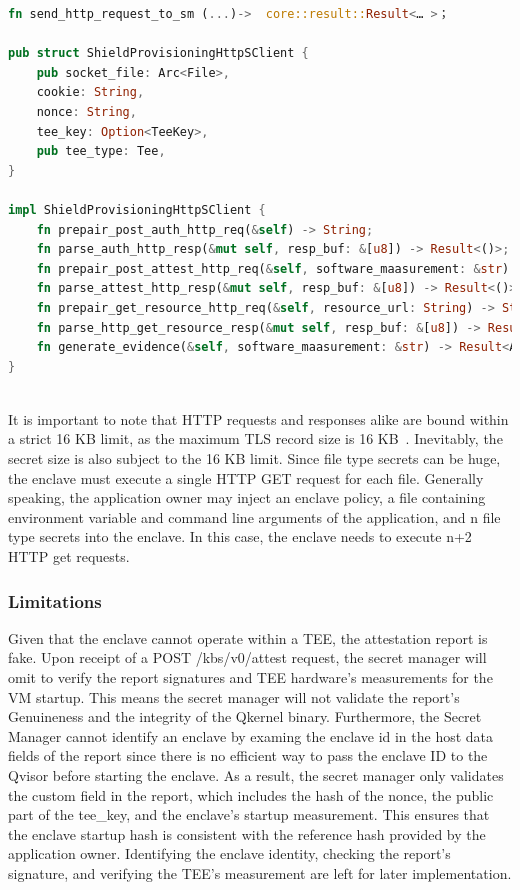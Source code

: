 \begin{lstlisting}[language=rust, caption= Functions for building the HTTP requests defined in the KBS attestation protocol, label={lst:http_connection}]
fn send_http_request_to_sm (...)->  core::result::Result<… >；

pub struct ShieldProvisioningHttpSClient {
    pub socket_file: Arc<File>,
    cookie: String,
    nonce: String,
    tee_key: Option<TeeKey>,
    pub tee_type: Tee,
}

impl ShieldProvisioningHttpSClient {
    fn prepair_post_auth_http_req(&self) -> String;
    fn parse_auth_http_resp(&mut self, resp_buf: &[u8]) -> Result<()>;
    fn prepair_post_attest_http_req(&self, software_maasurement: &str) -> Result<String>;
    fn parse_attest_http_resp(&mut self, resp_buf: &[u8]) -> Result<()>;
    fn prepair_get_resource_http_req(&self, resource_url: String) -> String;
    fn parse_http_get_resource_resp(&mut self, resp_buf: &[u8]) -> Result<Vec<u8>>;
    fn generate_evidence(&self, software_maasurement: &str) -> Result<Attestation>;
}
    
\end{lstlisting}

It is important to note that HTTP requests and responses alike are bound within a strict 16 KB limit, as the maximum TLS record size is 16 KB~\cite*{tls_record_size}. Inevitably, the secret size is also subject to the 16 KB limit. Since file type secrets can be huge, the 
enclave must execute a single HTTP GET request for each file. Generally speaking, the application owner may inject an enclave policy, a file containing environment variable and command line arguments of the application, and n file type secrets into the enclave. 
In this case, the enclave needs to execute n+2 HTTP get requests.

\subsubsection{Limitations}
\label{subsec:Limitations}

Given that the enclave cannot operate within a TEE, the attestation report is fake. Upon receipt of a POST /kbs/v0/attest request, the secret manager will omit to verify the report signatures and TEE hardware's measurements for the VM startup. This means the secret manager will not validate the report's 
Genuineness and the integrity of the Qkernel binary. Furthermore, the Secret Manager cannot identify an enclave by examing the enclave id in the host data fields of the report since there is no efficient way to pass the enclave ID to the Qvisor before starting the enclave. As a result, the secret 
manager only validates the custom field in the report, which includes the hash of the nonce, the public part of the tee\_key, and the enclave's startup measurement. This ensures that the enclave startup hash is consistent with the reference hash provided by the application owner. Identifying the enclave 
identity, checking the report's signature, and verifying the TEE's measurement are left for later implementation.


